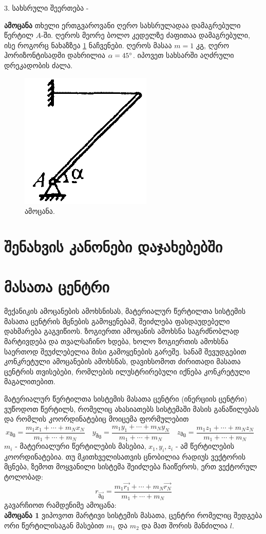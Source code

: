 \documentclass[a4paper]{book}
\begin{document}
3. სახსრული შეერთება - 


\textbf{ამოცანა} თხელი ერთგვაროვანი ღერო სახსრულადაა დამაგრებული წერტილ $A$-ში. ღეროს მეორე ბოლო კედელზე ძაფითაა დამაგრებული, ისე როგორც ნახაზზეა \ref{fig:statics_1}  ნაჩვენები. ღეროს მასაა $m = 1$ კგ, ღერო ჰორიზონტისადმი დახრილია $\alpha = 45 \degree$. იპოვეთ სახსარში აღძრული დრეკადობის ძალა. 
	 	\begin{figure}[H]
	 	   \centering
           \includegraphics[width=0.2\columnwidth]{figures/statics_1}
           \caption{ამოცანა.}
           \label{fig:statics_1}
        \end{figure}

\section{შენახვის კანონები დაჯახებებში}

\section{მასათა ცენტრი}
მექანიკის ამოცანების ამოხსნისას, მატერიალურ წერტილთა სისტემის მასათა ცენტრის მცნების გამოყენებამ, შეიძლება ფასდაუდებელი დახმარება გაგვიწიოს. ზოგიერთი ამოცანის ამოხსნა საგრძნობლად მარტივდება და თვალსაჩინო ხდება, ხოლო ზოგიერთის ამოხსნა საერთოდ შეუძლებელია მისი გამოყენების გარეშე. სანამ შევუდგებით კონკრეტული ამოცანების ამოხსნას, დავიხსომოთ ძირითადი მასათა ცენტრის თვისებები, რომლების ილუსტრირებული იქნება კონკრეტული მაგალითებით.

მატერიალურ წერტილთა სისტემის მასათა ცენტრი (ინერციის ცენტრი) ვუწოდოთ წერტილს, რომელიც ახასიათებს სისტემაში მასის განაწილებას და რომლის კოორდინატებიც მოიცემა ფორმულებით
	\begin{equation}
		x_{\text{მც}} = \frac{m_1x_1 + \dotsb + m_Nx_N}{m_1 + \dotsb + m_N} \quad
		y_{\text{მც}} = \frac{m_1y_1 + \dotsb + m_Ny_N}{m_1 + \dotsb + m_N} \quad
		z_{\text{მც}} = \frac{m_1z_1 + \dotsb + m_Nz_N}{m_1 + \dotsb + m_N} \quad
	\end{equation}
$m_i$ - მატერიალური წერტილების მასებია, $x_1,y_i,z_i$ - ამ წერტილების კოორდინატებია. თუ მკითხველისათვის ცნობილია რადიუს ვექტორის მცნება, ზემოთ მოყვანილი სისტემა შეიძლება ჩაიწეროს, ერთ ვექტორულ ტოლობად:
	\begin{equation}
		r_{\vec{\text{მც}}} = \frac{m_1\vec{r_1} + \dotsb + m_N\vec{r_N}}{m_1 + \dotsb + m_N}
	\end{equation}
გავარჩიოთ რამდენიმე ამოცანა:\\
\textbf{ამოცანა 1} ვიპოვოთ მარტივი სისტემის მასათა, ცენტრი რომელიც შედგება ორი წერტილისაგან მასებით $m_1$ და $m_2$ და მათ შორის მანძილია $l$.
\end{document}
